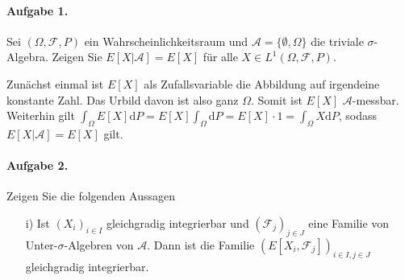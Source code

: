 \documentclass{article}
\begin{document}
\paragraph{Aufgabe 1.}
Sei $(\Omega,\mathscr{F},P)$ ein Wahrscheinlichkeitsraum und $\mathscr{A}=\{\emptyset,\Omega\}$ die triviale $\sigma$-Algebra.
Zeigen Sie $E[X|\mathscr{A}]=E[X]$ für alle $X\in L^1(\Omega,\mathscr{F},P)$.

Zunächst einmal ist $E[X]$ als Zufallsvariable die Abbildung auf irgendeine konstante Zahl.
Das Urbild davon ist also ganz $\Omega$.
Somit ist $E[X]$ $\mathscr{A}$-messbar.
Weiterhin gilt $\int_{\Omega}E[X]\mathrm{d}P=E[X]\int_{\Omega}\mathrm{d}P=E[X]\cdot1=\int_\Omega X\mathrm{d}P$, sodass $E[X|\mathscr{A}]=E[X]$ gilt.
\newpage

\paragraph{Aufgabe 2.} Zeigen Sie die folgenden Aussagen
\begin{enumerate}
\item[i)] Ist $(X_i)_{i\in I}$ gleichgradig integrierbar und $(\mathscr{F}_j)_{j\in J}$ eine Familie von Unter-$\sigma$-Algebren von $\mathscr{A}$.
  Dann ist die Familie $(E[X_i,\mathscr{F}_j])_{i\in I,j\in J}$ gleichgradig integrierbar.
\end{enumerate}
\end{document}
